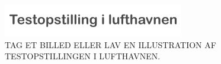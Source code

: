 %
\begin{figure}[H]
\centering
\includegraphics[width = 0.7\textwidth]{Figure/ParametreTestopstilling} 
\caption{TAG ET BILLED ELLER LAV EN ILLUSTRATION AF TESTOPSTILLINGEN I LUFTHAVNEN.}
\label{fig:ParametreTestopstilling}
\end{figure}
\noindent
%  

